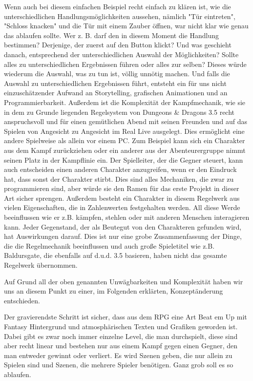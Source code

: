 Wenn auch bei diesem einfachen Beispiel recht einfach zu klären ist, wie die unterschiedlichen Handlungsmöglichkeiten aussehen, nämlich "Tür eintreten", "Schloss knacken" und die Tür mit einem Zauber öffnen, war nicht klar wie genau das ablaufen sollte. Wer z. B. darf den in diesem Moment die Handlung bestimmen? Derjenige, der zuerst auf den Button klickt? Und was geschieht danach, entsprechend der unterschiedlichen Auswahl der Möglichkeiten? Sollte alles zu unterschiedlichen Ergebnissen führen oder alles zur selben? Dieses würde wiederum die Auswahl, was zu tun ist, völlig unnötig machen. Und falls die Auswahl zu unterschiedlichen Ergebnissen führt, entsteht ein für uns nicht einzuschätzender Aufwand an Storytelling, grafischen Animationen und an Programmierbarkeit. Außerdem ist die Komplexität der Kampfmechanik, wie sie in dem zu Grunde liegenden Regelsystem von Dungeons & Dragons 3.5 recht anspruchsvoll und für einen gemütlichen Abend mit seinen Freunden und auf das Spielen von Angesicht zu Angesicht im Real Live ausgelegt. Dies ermöglicht eine andere Spielweise als allein vor einem PC. Zum Beispiel kann sich ein Charakter aus dem Kampf zurückziehen oder ein anderer aus der Abenteurergruppe nimmt seinen Platz in der Kampflinie ein. Der Spielleiter, der die Gegner steuert, kann auch entscheiden einen anderen Charakter anzugreifen, wenn er den Eindruck hat, dass sonst der Charakter stirbt. Dies sind alles Mechaniken, die zwar zu programmieren sind, aber würde sie den Ramen für das erste Projekt in dieser Art sicher sprengen.
Außerdem besteht ein Charakter in diesem Regelwerk aus vielen Eigenschaften, die in Zahlenwerten festgehalten werden. All diese Werde beeinflussen wie er z.B. kämpfen, stehlen oder mit anderen Menschen interagieren kann. Jeder Gegenstand, der als Beutegut von den Charakteren gefunden wird, hat Auswirkungen darauf. Dies ist nur eine grobe Zusammenfassung der Dinge, die die Regelmechanik beeinflussen und auch große Spieletitel wie z.B. Baldursgate, die ebenfalls auf d.u.d. 3.5 basieren, haben nicht das gesamte Regelwerk übernommen. 

Auf Grund all der oben genannten Unwägbarkeiten und Komplexität haben wir uns an diesem Punkt zu einer, im Folgenden erklärten, Konzeptänderung entschieden.

Der gravierendste Schritt ist sicher, dass aus dem RPG eine Art Beat em Up mit Fantasy Hintergrund und atmosphärischen Texten und Grafiken geworden ist. Dabei gibt es zwar noch immer einzelne Level, die man durchspielt, diese sind aber recht linear und bestehen nur aus einem Kampf gegen einen Gegner, den man entweder gewinnt oder verliert. Es wird Szenen geben, die nur allein zu Spielen sind und Szenen, die mehrere Spieler benötigen. Ganz grob soll es so ablaufen.

